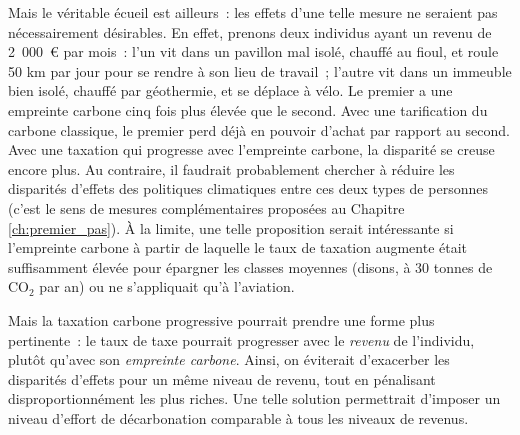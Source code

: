 \documentclass[a5paper,french,openany]{memoir}
\begin{document}
Mais le véritable écueil est ailleurs~: les effets d'une telle mesure ne seraient pas nécessairement désirables. En effet, prenons deux individus ayant un revenu de 2~000~\euro{} par mois~: l'un vit dans un pavillon mal isolé, chauffé au fioul, et roule 50 km par jour pour se rendre à son lieu de travail~; l'autre vit dans un immeuble bien isolé, chauffé par géothermie, et se déplace à vélo. Le premier a une empreinte carbone cinq fois plus élevée que le second. Avec une tarification du carbone classique, le premier perd déjà en pouvoir d'achat par rapport au second. Avec une taxation qui progresse avec l'empreinte carbone, la disparité se creuse encore plus. Au contraire, il faudrait probablement chercher à réduire les disparités d'effets des politiques climatiques entre ces deux types de personnes (c'est le sens de mesures complémentaires proposées au Chapitre \ref{ch:premier_pas}). À la limite, une telle proposition serait intéressante si l'empreinte carbone à partir de laquelle le taux de taxation augmente était suffisamment élevée pour épargner les classes moyennes (disons, à 30 tonnes de CO$_\text{2}$ par an) ou ne s'appliquait qu'à l'aviation. %

Mais la taxation carbone progressive pourrait prendre une forme plus pertinente~: le taux de taxe pourrait progresser avec le \textit{revenu} de l'individu, plutôt qu'avec son \textit{empreinte carbone}. Ainsi, on éviterait d'exacerber les disparités d'effets pour un même niveau de revenu, tout en pénalisant disproportionnément les plus riches. Une telle solution permettrait d'imposer un niveau d'effort de décarbonation comparable à tous les niveaux de revenus. 
\end{document}
